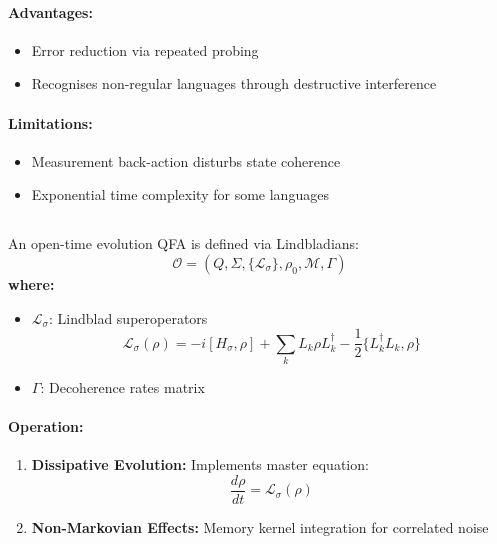 \paragraph{Advantages:}
\begin{itemize}
    \item Error reduction via repeated probing
    \item Recognises non-regular languages through destructive interference
\end{itemize}

\paragraph{Limitations:}
\begin{itemize}
    \item Measurement back-action disturbs state coherence
    \item Exponential time complexity for some languages
\end{itemize}

\subsection{}
\label{subsec:otqfa}

\begin{definition}
An open-time evolution QFA is defined via Lindbladians:
\[
\mathcal{O} = (Q, \Sigma, \{\mathcal{L}_\sigma\}, \rho_0, \mathcal{M}, \Gamma)
\]
\textbf{where:}
\begin{itemize}
    \item $\mathcal{L}_\sigma$: Lindblad superoperators
    \[
    \mathcal{L}_\sigma(\rho) = -i[H_\sigma,\rho] + \sum_k L_k\rho L_k^\dagger - \frac{1}{2}\{L_k^\dagger L_k, \rho\}
    \]
    \item $\Gamma$: Decoherence rates matrix
\end{itemize}
\end{definition}

\paragraph{Operation:}
\begin{enumerate}
    \item \textbf{Dissipative Evolution:} Implements master equation:
    \[
    \frac{d\rho}{dt} = \mathcal{L}_\sigma(\rho)
    \]
    \item \textbf{Non-Markovian Effects:} Memory kernel integration for correlated noise
\end{enumerate}

